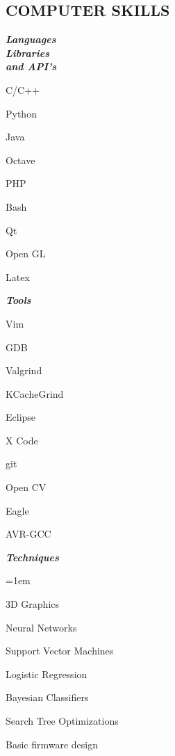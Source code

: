 \documentclass[margin]{res}
\begin{document}
\begin{resume}
\section{COMPUTER SKILLS}		\begin{multicols}{3}[\columnsep 2pt \linewidth 400pt]
									{\sl \textbf{Languages \\ Libraries \\ and API's}} \\
									\begin{list}{}{\leftmargin=1em} \itemsep -2pt
										\item C/C++ 
										\item Python
										\item Java 
										\item Octave 
										\item PHP 
										\item Bash 
										\item Qt 
										\item Open GL
										\item Latex
									\end{list}
									\vfill
									\columnbreak
									{\sl \textbf{Tools}} 
									\linebreak
									\linebreak
									\linebreak
							 		\begin{list}{}{\leftmargin=1em}\itemsep -2pt
										\item Vim 
										\item GDB
										\item Valgrind 
										\item KCacheGrind
										\item Eclipse
										\item X Code 
										\item git 
										\item Open CV 
										\item Eagle 
										\item AVR-GCC
									\end{list} \itemsep -2pt
									\vfill
									\columnbreak
			                		{\sl \textbf{Techniques}} \\ 								
									\linebreak
									\linebreak
									\begin{list} {}{\leftmargin=1em}\itemsep -2pt
										\item 3D Graphics 
										\item Neural Networks 
										\item Support Vector Machines 
										\item Logistic Regression 
										\item Bayesian Classifiers 
										\item Search Tree Optimizations 
										\item Basic firmware design 
									\end{list}
								\end{multicols}


\end{resume}
\end{document}
